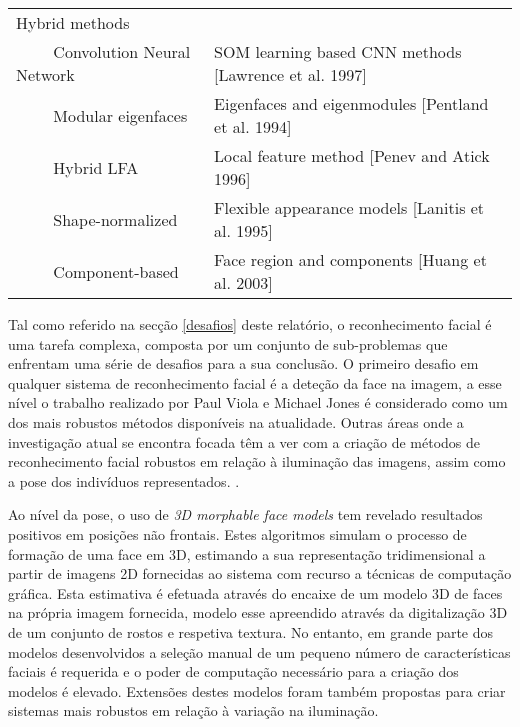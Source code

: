 \begin{center}
\begin{table}
\begin{tabular}{l p{8cm}}
Hybrid methods \\
$\qquad$        Convolution Neural Network & SOM learning based CNN methods [Lawrence et al. 1997] \\ 
$\qquad$        Modular eigenfaces         & Eigenfaces and eigenmodules [Pentland et al. 1994] \\ 
$\qquad$        Hybrid LFA                 & Local feature method [Penev and Atick 1996] \\ 
$\qquad$        Shape-normalized           & Flexible appearance models [Lanitis et al. 1995] \\ 
$\qquad$        Component-based            & Face region and components [Huang et al. 2003] \\
        \hline
    \end{tabular}
	\label{tabelaZhao}
\end{table}
\end{center}
 
 Tal como referido na secção \ref{desafios} deste relatório, o reconhecimento facial é uma tarefa complexa, composta por um conjunto de sub-problemas que enfrentam uma série de desafios para a sua conclusão. O primeiro desafio em qualquer sistema de reconhecimento facial é a deteção da face na imagem, a esse nível o trabalho realizado por Paul Viola e Michael Jones \citep{Viola2004} é considerado como um dos mais robustos métodos disponíveis na atualidade. Outras áreas onde a investigação atual se encontra focada têm a ver com a criação de métodos de reconhecimento facial robustos em relação à iluminação das imagens, assim como a pose dos indivíduos representados. \citep{Chellappa2010}.
 
 Ao nível da pose, o uso de  \textit{3D morphable face models} \cite{Blanz2003} tem revelado resultados positivos em posições não frontais. Estes algoritmos simulam o processo de formação de uma face em 3D, estimando a sua representação tridimensional a partir de imagens 2D fornecidas ao sistema com recurso a técnicas de computação gráfica. Esta estimativa é efetuada através do encaixe de um modelo 3D de faces na própria imagem fornecida, modelo esse apreendido através da digitalização 3D de um conjunto de rostos e respetiva textura. No entanto, em grande parte dos modelos desenvolvidos a seleção manual de um pequeno número de características faciais é requerida e o poder de computação necessário para a criação dos modelos é elevado. Extensões destes modelos foram também propostas para criar sistemas mais robustos em relação à variação na iluminação.  
 
